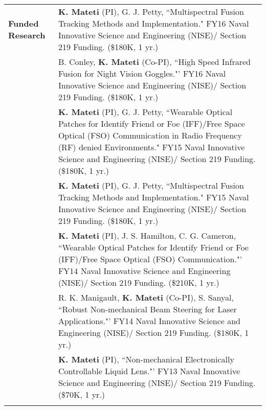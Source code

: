 \documentclass{article}[16pt]
\newlength{\lcolw}
\newlength{\rcolw}
\newlength{\hlcolw}
\begin{document}
\begin{tabular}{L{\hlcolw}  L{\rcolw}}
\textbf{\Large Funded Research}  
& \textbf{K. Mateti} (PI), G. J. Petty, ``Multispectral Fusion Tracking Methods and Implementation." FY16 Naval Innovative Science and Engineering (NISE)/ Section 219 Funding.  (\$180K, 1 yr.)
\vspace{0.1in} \\
& B. Conley, \textbf{K. Mateti} (Co-PI), ``High Speed Infrared Fusion for Night Vision Goggles."'  FY16 Naval Innovative Science and Engineering (NISE)/ Section 219 Funding.  (\$180K, 1 yr.)
\vspace{0.1in} \\
& \textbf{K. Mateti} (PI), G. J. Petty, ``Wearable Optical Patches for Identify Friend or Foe (IFF)/Free Space Optical (FSO) Communication in Radio Frequency (RF) denied Environments." FY15 Naval Innovative Science and Engineering (NISE)/ Section 219 Funding.  (\$180K, 1 yr.)\vspace{0.1in}  \\ 
& \textbf{K. Mateti} (PI), G. J. Petty, ``Multispectral Fusion Tracking Methods and Implementation." FY15 Naval Innovative Science and Engineering (NISE)/ Section 219 Funding.  (\$180K, 1 yr.)
\vspace{0.1in} \\
& \textbf{K. Mateti} (PI), J. S. Hamilton, C. G. Cameron, ``Wearable Optical Patches for Identify Friend or Foe (IFF)/Free Space Optical (FSO) Communication."'  FY14 Naval Innovative Science and Engineering (NISE)/ Section 219 Funding.  (\$210K, 1 yr.)
\vspace{0.1in} \\ 	
& R. K. Manigault, \textbf{K. Mateti} (Co-PI), S. Sanyal, ``Robust Non-mechanical Beam Steering for Laser Applications."'  FY14 Naval Innovative Science and Engineering (NISE)/ Section 219 Funding.  (\$180K, 1 yr.)
\vspace{0.1in} \\
& \textbf{K. Mateti} (PI), ``Non-mechanical Electronically Controllable Liquid Lens."'  FY13 Naval Innovative Science and Engineering (NISE)/ Section 219 Funding.  (\$70K, 1 yr.)
\vspace{0.1in} \\
\hline \\ 
\end{tabular}
\end{document}
